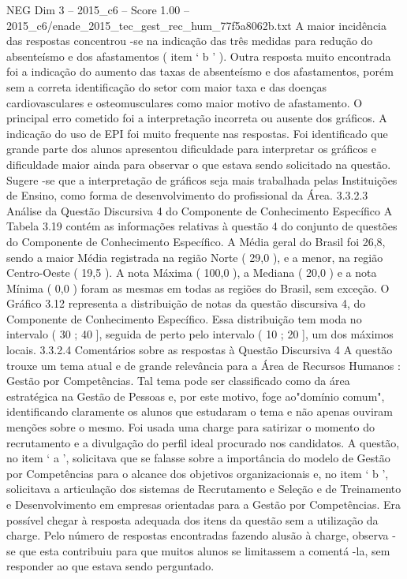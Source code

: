\begin{textsample}{NEG Dim 3 – 2015\_c6 – Score 1.00 – 2015\_c6/enade\_2015\_tec\_gest\_rec\_hum\_77f5a8062b.txt}
A maior incidência das respostas concentrou -se na indicação das três medidas para redução do absenteísmo e dos afastamentos ( item ‘ b ’ ).
Outra resposta muito encontrada foi a indicação do aumento das taxas de absenteísmo e dos afastamentos, porém sem a correta identificação do setor com maior taxa e das doenças cardiovasculares e osteomusculares como maior motivo de afastamento.
O principal erro cometido foi a interpretação incorreta ou ausente dos gráficos.
A indicação do uso de EPI foi muito frequente nas respostas.
Foi identificado que grande parte dos alunos apresentou dificuldade para interpretar os gráficos e dificuldade maior ainda para observar o que estava sendo solicitado na questão.
Sugere -se que a interpretação de gráficos seja mais trabalhada pelas Instituições de Ensino, como forma de desenvolvimento do profissional da Área. 3.3.2.3 Análise da Questão Discursiva 4 do Componente de Conhecimento Específico A Tabela 3.19 contém as informações relativas à questão 4 do conjunto de questões do Componente de Conhecimento Específico.
A Média geral do Brasil foi 26,8, sendo a maior Média registrada na região Norte ( 29,0 ), e a menor, na região Centro-Oeste ( 19,5 ).
A nota Máxima ( 100,0 ), a Mediana ( 20,0 ) e a nota Mínima ( 0,0 ) foram as mesmas em todas as regiões do Brasil, sem exceção.
O Gráfico 3.12 representa a distribuição de notas da questão discursiva 4, do Componente de Conhecimento Específico.
Essa distribuição tem moda no intervalo ( 30 ; 40 ], seguida de perto pelo intervalo ( 10 ; 20 ], um dos máximos locais. 3.3.2.4 Comentários sobre as respostas à Questão Discursiva 4 A questão trouxe um tema atual e de grande relevância para a Área de Recursos Humanos : Gestão por Competências.
Tal tema pode ser classificado como da área estratégica na Gestão de Pessoas e, por este motivo, foge ao"domínio comum", identificando claramente os alunos que estudaram o tema e não apenas ouviram menções sobre o mesmo.
Foi usada uma charge para satirizar o momento do recrutamento e a divulgação do perfil ideal procurado nos candidatos.
A questão, no item ‘ a ’, solicitava que se falasse sobre a importância do modelo de Gestão por Competências para o alcance dos objetivos organizacionais e, no item ‘ b ’, solicitava a articulação dos sistemas de Recrutamento e Seleção e de Treinamento e Desenvolvimento em empresas orientadas para a Gestão por Competências.
Era possível chegar à resposta adequada dos itens da questão sem a utilização da charge.
Pelo número de respostas encontradas fazendo alusão à charge, observa -se que esta contribuiu para que muitos alunos se limitassem a comentá -la, sem responder ao que estava sendo perguntado.

\end{textsample}
